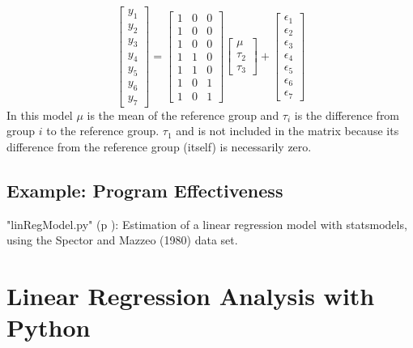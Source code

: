 \begin{equation}
  \begin{bmatrix}y_1 \\ y_2 \\ y_3 \\ y_4 \\ y_5 \\ y_6 \\ y_7 \end{bmatrix} =
  \begin{bmatrix}1 &0 &0 \\1 &0  &0 \\ 1 & 0 & 0 \\ 1 & 1 & 0 \\ 1 & 1 & 0 \\ 1 & 0 & 1 \\ 1  & 0 & 1\end{bmatrix}
  \begin{bmatrix}\mu \\  \tau_2 \\ \tau_3 \end{bmatrix}
  +
  \begin{bmatrix} \epsilon_1 \\ \epsilon_2 \\ \epsilon_3 \\ \epsilon_4 \\ \epsilon_5 \\ \epsilon_6 \\ \epsilon_7 \end{bmatrix}
\end{equation}
In this model $\mu$ is the mean of the reference group and $\tau_i$ is the difference from group $i$ to the reference group. $\tau_1$ and is not included in the matrix because its difference from the reference group (itself) is necessarily zero.
\subsection{Example: Program Effectiveness}



\PyImg "linRegModel.py" (p \pageref{py:linRegModel}): Estimation of a linear regression model with statsmodels, using the Spector and Mazzeo (1980) data set.

\section{Linear Regression Analysis with Python}

